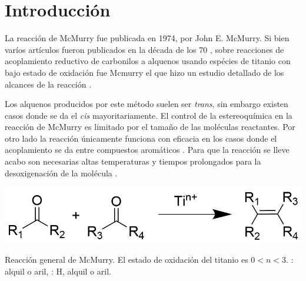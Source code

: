 \documentclass[fleqn,10pt]{SelfArx}
\begin{document}
\flushbottom %

\maketitle %


\thispagestyle{empty} %




\section*{Introducci\'on} %

La reacci\'on de McMurry fue publicada en 1974, por John E. McMurry. Si bien var\'ios art\'iculos fueron publicados en la d\'ecada de los 70 \cite{Mukaiyama1973}\cite{Mukaiyama1974}, sobre reacciones de acoplamiento reductivo de carbonilos a alquenos usando esp\'ecies de titanio con bajo estado de oxidaci\'on fue Mcmurry el que hizo un estudio detallado de los alcances de la reacci\'on \cite{Wang2010}.

Los alquenos producidos por este m\'etodo suelen ser \textit{trans}, sin embargo existen casos donde se da el \textit{cis} mayoritariamente. El control de la estereoqu\'imica en la reacci\'on de McMurry es limitado por el tama\~no de las mol\'eculas reactantes. Por otro lado la reacci\'on \'unicamente funciona con eficacia en los casos donde el acoplamiento se da entre compuestos arom\'aticos \cite{Wang2010}. Para que la reacci\'on se lleve acabo son necesarias altas temperaturas y tiempos prolongados para la desoxigenaci\'on de la mol\'ecula \cite{Wang2010}\cite{Villiers1997}.

\begin{scheme}[h]
	\centering
	\includegraphics[width=0.9\linewidth]{structures/generalreaction.png}
	\caption{Reacci\'on general de McMurry. El estado de oxidaci\'on del titanio es $0<n<3$. : alquil o aril, : H, alquil o aril. \cite{Wang2010}}
\end{scheme}
\end{document}
